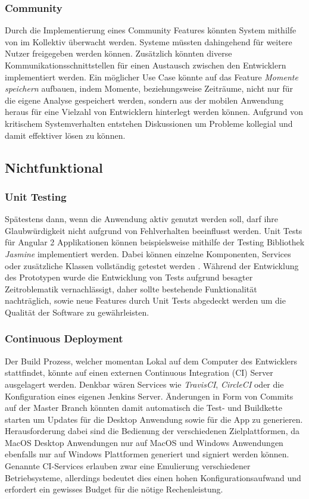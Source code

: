 \subsubsection{Community}

Durch die Implementierung eines Community Features könnten System mithilfe von \projectname{} im Kollektiv überwacht werden.
Systeme müssten dahingehend für weitere Nutzer freigegeben werden können.
Zusätzlich könnten diverse Kommunikationsschnittstellen für einen
Austausch zwischen den Entwicklern implementiert werden. Ein möglicher Use Case könnte auf das Feature
\emph{Momente speichern} aufbauen,
indem Momente, beziehungsweise Zeiträume, nicht nur für die eigene Analyse gespeichert werden, sondern aus der mobilen Anwendung heraus
für eine Vielzahl von Entwicklern hinterlegt werden können.
Aufgrund von kritischem Systemverhalten entstehen Diskussionen um Probleme kollegial und damit effektiver lösen zu können.

\subsection{Nichtfunktional}


\subsubsection{Unit Testing}

Spätestens dann, wenn die Anwendung aktiv genutzt werden soll, darf ihre Glaubwürdigkeit nicht aufgrund von Fehlverhalten beeinflusst werden.
Unit Tests für Angular 2 Applikationen können beispielsweise mithilfe der Testing Bibliothek \emph{Jasmine} implementiert werden.
Dabei können einzelne Komponenten, Services oder zusätzliche Klassen vollständig getestet werden \cite{Angul78:online}.
Während der Entwicklung des Prototypen \projectname{} wurde die Entwicklung von Tests aufgrund besagter Zeitroblematik vernachlässigt,
daher sollte bestehende Funktionalität nachträglich, sowie neue Features durch Unit Tests abgedeckt werden um die Qualität der Software zu gewährleisten.

\subsubsection{Continuous Deployment}

Der Build Prozess, welcher momentan Lokal auf dem Computer des Entwicklers stattfindet, könnte auf einen externen Continuous Integration (CI) Server ausgelagert werden.
Denkbar wären Services wie \emph{TravisCI}, \emph{CircleCI} oder die Konfiguration eines eigenen Jenkins Server.
Änderungen in Form von Commits auf der Master Branch könnten damit automatisch die Test- und Buildkette starten um Updates für die Desktop Anwendung sowie für die App zu generieren.
Herausforderung dabei sind die Bedienung der verschiedenen Zielplattformen, da MacOS Desktop Anwendungen nur auf MacOS und
Windows Anwendungen ebenfalls nur auf Windows Plattformen generiert und signiert werden können.
Genannte CI-Services erlauben zwar eine Emulierung verschiedener Betriebsysteme,
allerdings bedeutet dies einen hohen Konfigurationsaufwand und erfordert ein gewisses Budget für die nötige Rechenleistung.


